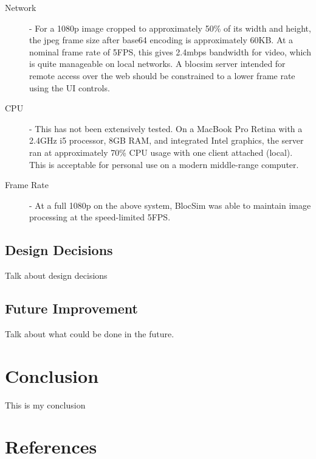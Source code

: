 \documentclass[titlesmallcaps, examinerscopy, copyrightpage]{uqthesis}
\begin{document}
\begin{description}
	\item[Network] - For a 1080p image cropped to approximately 50\% of its width and height, the jpeg frame size after base64 encoding is approximately 60KB. At a nominal frame rate of 5FPS, this gives 2.4mbps bandwidth for video, which is quite manageable on local networks. A blocsim server intended for remote access over the web should be constrained to a lower frame rate using the UI controls.
	\item[CPU] - This has not been extensively tested. On a MacBook Pro Retina with a 2.4GHz i5 processor, 8GB RAM, and integrated Intel graphics, the server ran at approximately 70\% CPU usage with one client attached (local). This is acceptable for personal use on a modern middle-range computer. 
	\item[Frame Rate] - At a full 1080p on the above system, BlocSim was able to maintain image processing at the speed-limited 5FPS.
\end{description}


\section{Design Decisions}
\label{ch:review:design}

Talk about design decisions

\section{Future Improvement}

Talk about what could be done in the future.

\chapter{Conclusion}

 This is my conclusion




























\chapter*{References}
\begingroup
{}
\renewcommand{\addcontentsline}[3]{}
\renewcommand{\chapter}[2]{}

\endgroup


\end{document}
